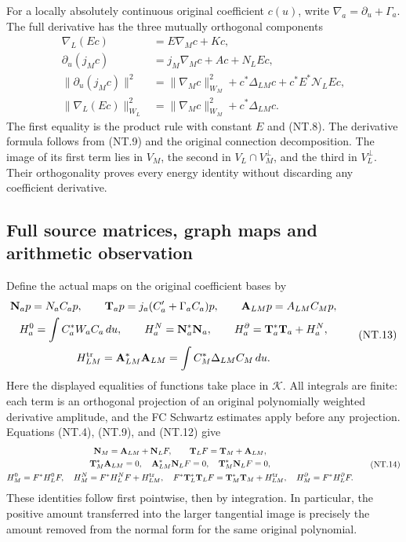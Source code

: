 For a locally absolutely continuous original coefficient $c(u)$,
write $\nabla_a=\partial_u+\Gamma_a$. The full derivative has
the three mutually orthogonal components
\[
 \begin{aligned}
 \nabla_L(Ec)&=E\nabla_Mc+Kc,\\
 \partial_u(j_Mc)&=j_M\nabla_Mc+Ac+N_LEc,\\
 \|\partial_u(j_Mc)\|^2
 &=\|\nabla_Mc\|_{W_M}^2+c^*\Delta_{LM}c
                               +c^*E^*\mathcal N_LEc,\\
 \|\nabla_L(Ec)\|_{W_L}^2
 &=\|\nabla_Mc\|_{W_M}^2+c^*\Delta_{LM}c.
 \end{aligned}
 \tag{NT.12}
\]
The first equality is the product rule with constant $E$ and
(NT.8). The derivative formula follows from (NT.9) and the
original connection decomposition. The image of its first term
lies in $V_M$, the second in $V_L\cap V_M^\perp$, and the
third in $V_L^\perp$. Their orthogonality proves every energy
identity without discarding any coefficient derivative.

\subsection{Full source matrices, graph maps and arithmetic observation}

Define the actual maps on the original coefficient bases by
\[
 \begin{gathered}
 \mathbf N_a p=N_aC_ap,\qquad
 \mathbf T_a p=j_a(C_a'+\Gamma_a C_a)p,\qquad
 \mathbf A_{LM}p=A_{LM}C_Mp,\\
 H_a^0=\int C_a^*W_aC_a\,du,\qquad
 H_a^N=\mathbf N_a^*\mathbf N_a,\qquad
 H_a^\partial=\mathbf T_a^*\mathbf T_a+H_a^N,\\
 H_{LM}^{\rm tr}=\mathbf A_{LM}^*\mathbf A_{LM}
                    =\int C_M^*\Delta_{LM}C_M\,du.
 \end{gathered}
 \tag{NT.13}
\]
Here the displayed equalities of functions take place in $\mathscr K$.
All integrals are finite: each term is an orthogonal projection
of an original polynomially weighted derivative amplitude, and
the FC Schwartz estimates apply before any projection. Equations
(NT.4), (NT.9), and (NT.12) give
\[
 \begin{gathered}
 \mathbf N_M=\mathbf A_{LM}+\mathbf N_LF,\qquad
 \mathbf T_LF=\mathbf T_M+\mathbf A_{LM},\\
 \mathbf T_M^*\mathbf A_{LM}=0,\quad
 \mathbf A_{LM}^*\mathbf N_LF=0,\quad
 \mathbf T_M^*\mathbf N_LF=0,\\
 H_M^0=F^*H_L^0F,\quad
 H_M^N=F^*H_L^NF+H_{LM}^{\rm tr},\quad
 F^*\mathbf T_L^*\mathbf T_LF
        =\mathbf T_M^*\mathbf T_M+H_{LM}^{\rm tr},\quad
 H_M^\partial=F^*H_L^\partial F.
 \end{gathered}
 \tag{NT.14}
\]
These identities follow first pointwise, then by integration.
In particular, the positive amount transferred into the larger
tangential image is precisely the amount removed from the normal
form for the same original polynomial.


